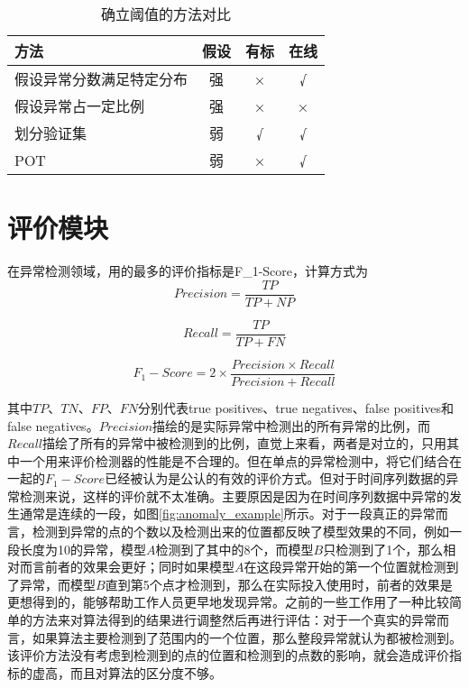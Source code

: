 \begin{table}[htbp]
  \centering
  \begin{tabular}{lccc}
    \toprule
    方法 & 假设 & 有标 & 在线 \\
    \midrule
    假设异常分数满足特定分布 & 强 & × & √ \\
    假设异常占一定比例 & 强 & × & × \\
    划分验证集 & 弱 & √ & √ \\
    POT & 弱 & × & √\\
    \bottomrule
   \end{tabular}
   \caption{确立阈值的方法对比}
   \label{tab:threshold}
\end{table}

\section{评价模块}
在异常检测领域，用的最多的评价指标是F\_1-Score，计算方式为
\begin{equation*}
  Precision = \frac{TP}{TP + NP}
\end{equation*}

\begin{equation*}
  Recall = \frac{TP}{TP + FN}
\end{equation*}

\begin{equation*}
  F_1-Score = 2\times \frac { Precision \times Recall}{Precision + Recall}
\end{equation*}

其中$TP$、$TN$、$FP$、$FN$分别代表true positives、true negatives、false positives和 false negatives。$Precision$描绘的是实际异常中检测出的所有异常的比例，而$Recall$描绘了所有的异常中被检测到的比例，直觉上来看，两者是对立的，只用其中一个用来评价检测器的性能是不合理的。但在单点的异常检测中，将它们结合在一起的$F_1-Score$已经被认为是公认的有效的评价方式。但对于时间序列数据的异常检测来说，这样的评价就不太准确。主要原因是因为在时间序列数据中异常的发生通常是连续的一段，如图\ref{fig:anomaly_example}所示。对于一段真正的异常而言，检测到异常的点的个数以及检测出来的位置都反映了模型效果的不同，例如一段长度为10的异常，模型$A$检测到了其中的8个，而模型$B$只检测到了1个，那么相对而言前者的效果会更好；同时如果模型$A$在这段异常开始的第一个位置就检测到了异常，而模型$B$直到第5个点才检测到，那么在实际投入使用时，前者的效果是更想得到的，能够帮助工作人员更早地发现异常。之前的一些工作\cite{xu2018unsupervised}\cite{su2019robust}用了一种比较简单的方法来对算法得到的结果进行调整然后再进行评估：对于一个真实的异常而言，如果算法主要检测到了范围内的一个位置，那么整段异常就认为都被检测到。该评价方法没有考虑到检测到的点的位置和检测到的点数的影响，就会造成评价指标的虚高，而且对算法的区分度不够。

